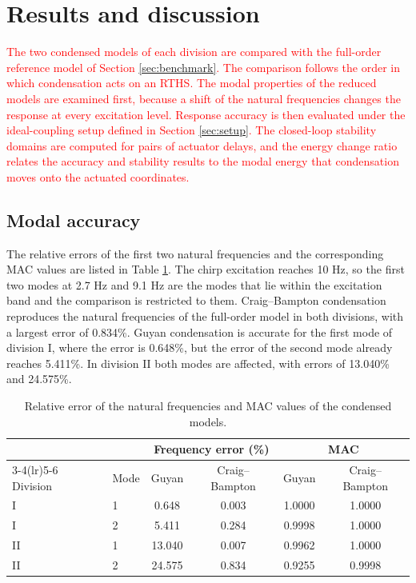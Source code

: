 \documentclass[11pt,a4paper]{article}
\numberwithin{equation}{section}
\newcommand{\rev}[1]{\textcolor{red}{#1}}
\begin{document}
\section{Results and discussion} \label{sec5}

\rev{The two condensed models of each division are compared with the full-order reference model of Section \ref{sec:benchmark}. The comparison follows the order in which condensation acts on an RTHS. The modal properties of the reduced models are examined first, because a shift of the natural frequencies changes the response at every excitation level. Response accuracy is then evaluated under the ideal-coupling setup defined in Section \ref{sec:setup}. The closed-loop stability domains are computed for pairs of actuator delays, and the energy change ratio relates the accuracy and stability results to the modal energy that condensation moves onto the actuated coordinates.}

\subsection{Modal accuracy}
\label{sec:modal-accuracy}

The relative errors of the first two natural frequencies and the corresponding MAC values are listed in Table \ref{tab:modal}. The chirp excitation reaches 10 Hz, so the first two modes at 2.7 Hz and 9.1 Hz are the modes that lie within the excitation band and the comparison is restricted to them. Craig--Bampton condensation reproduces the natural frequencies of the full-order model in both divisions, with a largest error of 0.834\%. Guyan condensation is accurate for the first mode of division I, where the error is 0.648\%, but the error of the second mode already reaches 5.411\%. In division II both modes are affected, with errors of 13.040\% and 24.575\%.

\begin{table}[htbp]
	\centering
	\caption{Relative error of the natural frequencies and MAC values of the condensed models.}
	\label{tab:modal}
	\begin{tabular}{llcccc}
		\toprule
		& & \multicolumn{2}{c}{Frequency error (\%)} & \multicolumn{2}{c}{MAC}\\
		\cmidrule(lr){3-4}\cmidrule(lr){5-6}
		Division & Mode & Guyan & Craig--Bampton & Guyan & Craig--Bampton\\
		\midrule
		I  & 1 & 0.648  & 0.003 & 1.0000 & 1.0000\\
		I  & 2 & 5.411  & 0.284 & 0.9998 & 1.0000\\
		\midrule
		II & 1 & 13.040 & 0.007 & 0.9962 & 1.0000\\
		II & 2 & 24.575 & 0.834 & 0.9255 & 0.9998\\
		\bottomrule
	\end{tabular}
\end{table}
\end{document}
